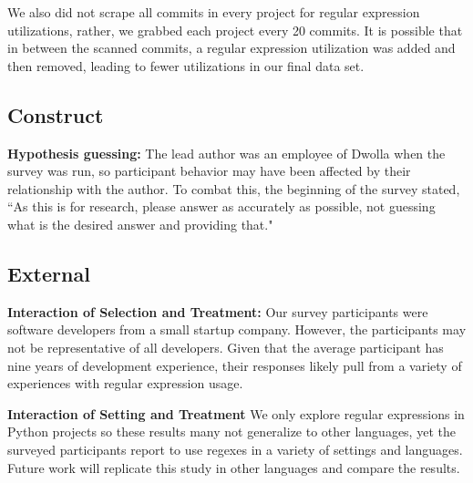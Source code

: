\documentclass{sig-alternate}
\begin{document}
We also did not scrape all commits in every project for regular expression utilizations, rather, we grabbed each project every 20 commits. It is possible that in between the scanned commits, a regular expression utilization was added and then removed, leading to fewer utilizations in our final data set.


\subsection{Construct}

\textbf{Hypothesis guessing:} The lead author was an employee of Dwolla when the survey was run, so participant behavior may have been affected by their relationship with the author. To combat this, the beginning of the survey stated, ``As this is for research, please answer as accurately as possible, not guessing what is the desired answer and providing that."

\subsection{External}

\textbf{Interaction of Selection and Treatment:} Our survey participants were software developers from a small startup company. However, the participants may not be representative of all developers. Given that the average participant has nine years of development experience, their responses likely pull from a variety of experiences with regular expression usage.

\textbf{Interaction of Setting and Treatment}
We only explore regular expressions in Python projects so these results many not generalize to other languages, yet the surveyed participants report to use regexes in a  variety of settings and languages. Future work will replicate this study in other languages and compare the results.



%
%
%
\end{document}
